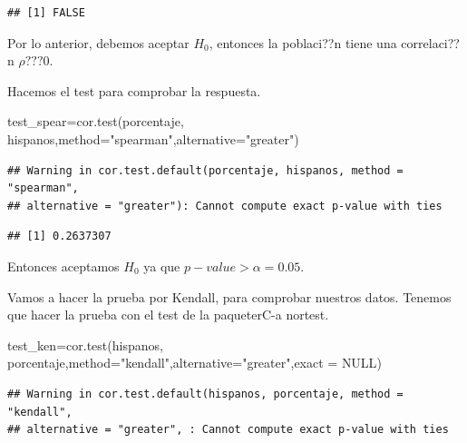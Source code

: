 \documentclass[
]{article}
\newenvironment{Shaded}{\begin{snugshade}}{\end{snugshade}}
\newcommand{\AttributeTok}[1]{\textcolor[rgb]{0.77,0.63,0.00}{#1}}
\newcommand{\ConstantTok}[1]{\textcolor[rgb]{0.00,0.00,0.00}{#1}}
\newcommand{\FunctionTok}[1]{\textcolor[rgb]{0.00,0.00,0.00}{#1}}
\newcommand{\NormalTok}[1]{#1}
\newcommand{\OtherTok}[1]{\textcolor[rgb]{0.56,0.35,0.01}{#1}}
\newcommand{\SpecialCharTok}[1]{\textcolor[rgb]{0.00,0.00,0.00}{#1}}
\newcommand{\StringTok}[1]{\textcolor[rgb]{0.31,0.60,0.02}{#1}}
\begin{document}
\begin{verbatim}
## [1] FALSE
\end{verbatim}

Por lo anterior, debemos aceptar \(H_{0}\), entonces la poblaci??n tiene
una correlaci??n \(\rho ??? 0\).

Hacemos el test para comprobar la respuesta.

\begin{Shaded}
\begin{Highlighting}[]
\NormalTok{test\_spear}\OtherTok{=}\FunctionTok{cor.test}\NormalTok{(porcentaje, hispanos,}\AttributeTok{method=}\StringTok{"spearman"}\NormalTok{,}\AttributeTok{alternative=}\StringTok{"greater"}\NormalTok{)}
\end{Highlighting}
\end{Shaded}

\begin{verbatim}
## Warning in cor.test.default(porcentaje, hispanos, method = "spearman",
## alternative = "greater"): Cannot compute exact p-value with ties
\end{verbatim}

\begin{Shaded}
\end{Shaded}

\begin{verbatim}
## [1] 0.2637307
\end{verbatim}

Entonces aceptamos \(H_{0}\) ya que \(p-value>\alpha= 0.05\).

Vamos a hacer la prueba por Kendall, para comprobar nuestros datos.
Tenemos que hacer la prueba con el test de la paqueterC-a nortest.

\begin{Shaded}
\begin{Highlighting}[]
\NormalTok{test\_ken}\OtherTok{=}\FunctionTok{cor.test}\NormalTok{(hispanos, porcentaje,}\AttributeTok{method=}\StringTok{"kendall"}\NormalTok{,}\AttributeTok{alternative=}\StringTok{"greater"}\NormalTok{,}\AttributeTok{exact =} \ConstantTok{NULL}\NormalTok{)}
\end{Highlighting}
\end{Shaded}

\begin{verbatim}
## Warning in cor.test.default(hispanos, porcentaje, method = "kendall",
## alternative = "greater", : Cannot compute exact p-value with ties
\end{verbatim}
\end{document}
